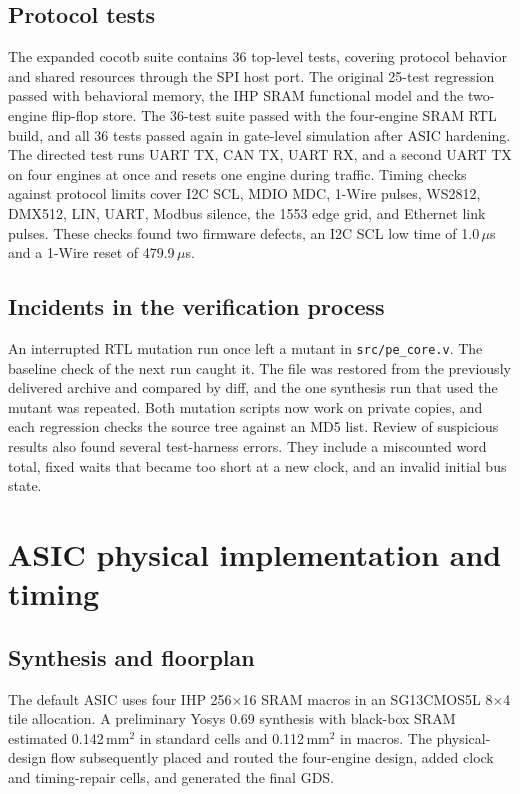 \documentclass[11pt]{article}
\newcommand{\fw}[1]{\texttt{\detokenize{#1}}}
\begin{document}
\subsection{Protocol tests}
The expanded cocotb suite contains 36 top-level tests, covering protocol behavior and shared resources through the SPI host port. The original 25-test regression passed with behavioral memory, the IHP SRAM functional model and the two-engine flip-flop store. The 36-test suite passed with the four-engine SRAM RTL build, and all 36 tests passed again in gate-level simulation after ASIC hardening.
The directed test \fw{four_engines} runs UART TX, CAN TX, UART RX, and a second UART TX on four engines at once and resets one engine during traffic.
Timing checks against protocol limits cover I2C SCL, MDIO MDC, 1-Wire pulses, WS2812, DMX512, LIN, UART, Modbus silence, the 1553 edge grid, and Ethernet link pulses.
These checks found two firmware defects, an I2C SCL low time of 1.0\,$\mu$s and a 1-Wire reset of 479.9\,$\mu$s.

\subsection{Incidents in the verification process}
An interrupted RTL mutation run once left a mutant in \texttt{src/pe\_core.v}.
The baseline check of the next run caught it.
The file was restored from the previously delivered archive and compared by diff, and the one synthesis run that used the mutant was repeated.
Both mutation scripts now work on private copies, and each regression checks the source tree against an MD5 list.
Review of suspicious results also found several test-harness errors.
They include a miscounted word total, fixed waits that became too short at a new clock, and an invalid initial bus state.

\section{ASIC physical implementation and timing}

\subsection{Synthesis and floorplan}
The default ASIC uses four IHP 256$\times$16 SRAM macros in an SG13CMOS5L 8$\times$4 tile allocation. A preliminary Yosys 0.69 synthesis with black-box SRAM estimated 0.142\,mm$^2$ in standard cells and 0.112\,mm$^2$ in macros. The physical-design flow subsequently placed and routed the four-engine design, added clock and timing-repair cells, and generated the final GDS.
\end{document}
